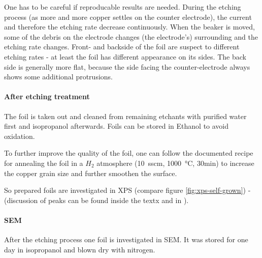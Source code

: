 One has to be careful if reproducable results are needed. During the etching process (as more and more copper settles on the counter electrode), the current and therefore the etching rate decrease continuously. When the beaker is moved, some of the debris on the electrode changes (the electrode's) surrounding and the etching rate changes. Front- and backside of the foil are suspect to different etching rates - at least the foil has different appearance on its sides. The back side is generally more flat, because the side facing the counter-electrode always shows some additional protrusions.

\paragraph{After etching treatment}
The foil is taken out and cleaned from remaining etchants with purified water first and isopropanol afterwards. Foils can be stored in Ethanol to avoid oxidation. 

To further improve the quality of the foil, one can follow the documented recipe for annealing the foil in a $H_2$ atmosphere (\SI{10}{sscm}, \SI{1000}{\celsius}, 30min)\cite{kim_synthesis_2012} to increase the copper grain size and further smoothen the surface. 

So prepared foils are investigated in XPS (compare figure \ref{fig:xps-self-grown}) - (discussion of peaks can be found inside the textx and in \cite[8]{stables_report_2008}).

\paragraph{SEM}
After the etching process one foil is investigated in SEM. It was stored for one day in isopropanol and blown dry with nitrogen. 

